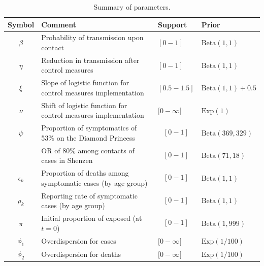 \documentclass{article}
\begin{document}
	\begin{table}[h]
		\centering
		\caption{Summary of parameters.}
		\begin{tabular}{cp{10cm}ll}
			\hline
			Symbol & Comment & Support & Prior \\
			\hline 
			$\beta$ & Probability of transmission upon contact & $[0-1]$ & $\text{Beta}(1,1)$  \\
			$\eta$ & Reduction in transmission after control measures & $[0-1]$ & $\text{Beta}(1,1)$ \\
			$\xi$ & Slope of logistic function for control measures implementation & $[0.5-1.5]$ & $ \text{Beta}(1,1) + 0.5$  \\
			$\nu$ & Shift of logistic function for control measures implementation & $[0-\infty[$ & $\text{Exp}(1)$  \\
			$\psi$ & Proportion of symptomatics of 53\% on the Diamond Princess \cite{diamond2} & $$[0-1]$$ & $\text{Beta}(369,329)$ \\
			 & OR of 80\% among contacts of cases in Shenzen \cite{Bi2020} & $$[0-1]$$ & $\text{Beta}(71,18)$ \\
			$\epsilon_k$ & Proportion of deaths among symptomatic cases (by age group) & $$[0-1]$$ & $\text{Beta}(1,1)$  \\
			$\rho_k$ & Reporting rate of symptomatic cases (by age group) & $$[0-1]$$ & $\text{Beta}(1,1)$  \\
			$\pi$ & Initial proportion of exposed (at $t=0$) & $$[0-1]$$ & $\text{Beta}(1,999)$  \\
			$\phi_1$ & Overdispersion for cases & $[0-\infty[$ & $\text{Exp}(1/100)$  \\
			$\phi_2$ & Overdispersion for deaths & $[0-\infty[$ & $\text{Exp}(1/100)$  \\
			
			\hline 
		\end{tabular} 
		
	\end{table}
	
\end{document}
